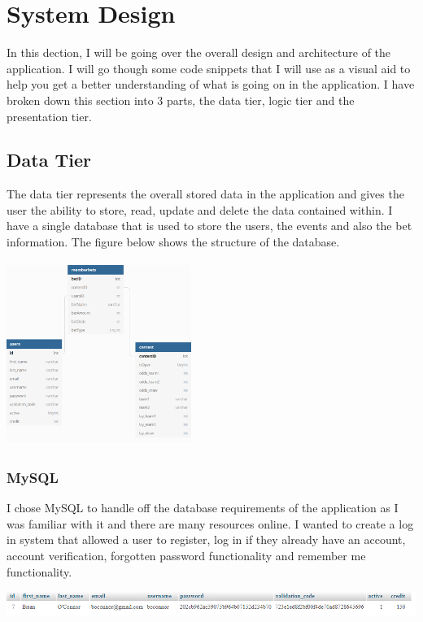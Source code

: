 \chapter{System Design}
In this dection, I will be going over the overall design and architecture of the application. I will go though some code snippets that I will use as a visual aid to help you get a better understanding of what is going on in the application. I have broken down this section into 3 parts, the data tier, logic tier and the presentation tier. 

\section{Data Tier}
The data tier represents the overall stored data in the application and gives the user the ability to store, read, update and delete the data contained within. I have a single database that is used to store the users, the events and also the bet information. The figure below shows the structure of the database.

\includegraphics[width=6cm, height=6cm]{img/DatabaseFinal.png}


\subsection{MySQL}
I chose MySQL to handle off the database requirements of the application as I was familiar with it and there are many resources online. I wanted to create a log in system that allowed a user to register, log in if they already have an account, account verification, forgotten password functionality and remember me functionality. 

\includegraphics[width=\textwidth,height=\textheight,keepaspectratio]{img/Users.png}

